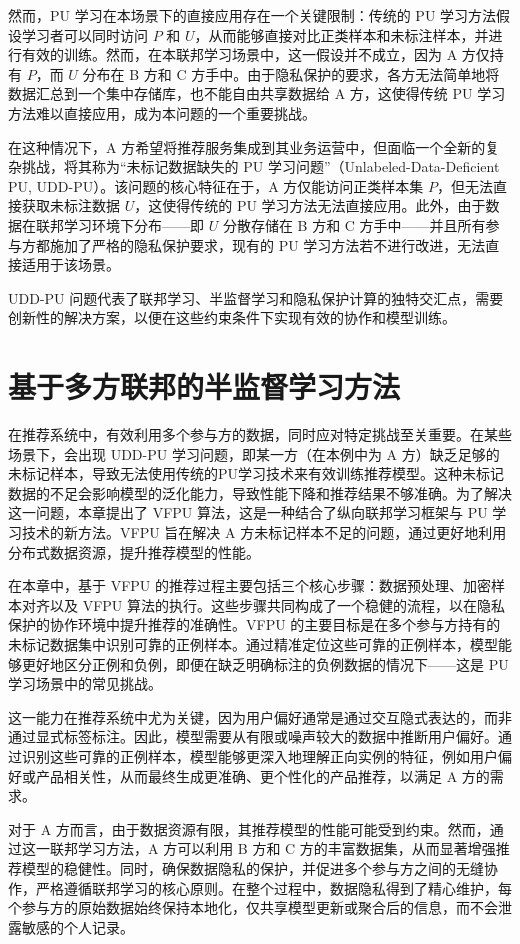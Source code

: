 然而，PU 学习在本场景下的直接应用存在一个关键限制：传统的 PU 学习方法假设学习者可以同时访问 $ P $ 和 $ U $，从而能够直接对比正类样本和未标注样本，并进行有效的训练。然而，在本联邦学习场景中，这一假设并不成立，因为 A 方仅持有 $ P $，而 $ U $ 分布在 B 方和 C 方手中。由于隐私保护的要求，各方无法简单地将数据汇总到一个集中存储库，也不能自由共享数据给 A 方，这使得传统 PU 学习方法难以直接应用，成为本问题的一个重要挑战。

在这种情况下，A 方希望将推荐服务集成到其业务运营中，但面临一个全新的复杂挑战，将其称为“未标记数据缺失的 PU 学习问题”（Unlabeled-Data-Deficient PU, UDD-PU）。该问题的核心特征在于，A 方仅能访问正类样本集 $ P $，但无法直接获取未标注数据 $ U $，这使得传统的 PU 学习方法无法直接应用。此外，由于数据在联邦学习环境下分布——即 $ U $ 分散存储在 B 方和 C 方手中——并且所有参与方都施加了严格的隐私保护要求，现有的 PU 学习方法若不进行改进，无法直接适用于该场景。

UDD-PU 问题代表了联邦学习、半监督学习和隐私保护计算的独特交汇点，需要创新性的解决方案，以便在这些约束条件下实现有效的协作和模型训练。


\section{基于多方联邦的半监督学习方法}
在推荐系统中，有效利用多个参与方的数据，同时应对特定挑战至关重要。在某些场景下，会出现 UDD-PU 学习问题，即某一方（在本例中为 A 方）缺乏足够的未标记样本，导致无法使用传统的PU学习技术来有效训练推荐模型。这种未标记数据的不足会影响模型的泛化能力，导致性能下降和推荐结果不够准确。为了解决这一问题，本章提出了 VFPU 算法，这是一种结合了纵向联邦学习框架与 PU 学习技术的新方法。VFPU 旨在解决 A 方未标记样本不足的问题，通过更好地利用分布式数据资源，提升推荐模型的性能。

在本章中，基于 VFPU 的推荐过程主要包括三个核心步骤：数据预处理、加密样本对齐以及 VFPU 算法的执行。这些步骤共同构成了一个稳健的流程，以在隐私保护的协作环境中提升推荐的准确性。VFPU 的主要目标是在多个参与方持有的未标记数据集中识别可靠的正例样本。通过精准定位这些可靠的正例样本，模型能够更好地区分正例和负例，即便在缺乏明确标注的负例数据的情况下——这是 PU 学习场景中的常见挑战。

这一能力在推荐系统中尤为关键，因为用户偏好通常是通过交互隐式表达的，而非通过显式标签标注。因此，模型需要从有限或噪声较大的数据中推断用户偏好。通过识别这些可靠的正例样本，模型能够更深入地理解正向实例的特征，例如用户偏好或产品相关性，从而最终生成更准确、更个性化的产品推荐，以满足 A 方的需求。

对于 A 方而言，由于数据资源有限，其推荐模型的性能可能受到约束。然而，通过这一联邦学习方法，A 方可以利用 B 方和 C 方的丰富数据集，从而显著增强推荐模型的稳健性。同时，确保数据隐私的保护，并促进多个参与方之间的无缝协作，严格遵循联邦学习的核心原则。在整个过程中，数据隐私得到了精心维护，每个参与方的原始数据始终保持本地化，仅共享模型更新或聚合后的信息，而不会泄露敏感的个人记录。

